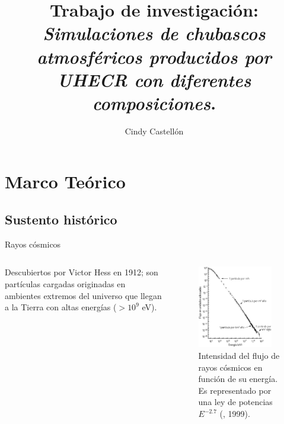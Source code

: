 \documentclass[11pt,table,compress]{beamer}
\author{Cindy Castellón}
\title[Defensa final]{\textbf{Trabajo de investigación:} \\ \textit{Simulaciones de chubascos atmosféricos producidos por UHECR con diferentes composiciones}.}
\institute{Escuela de Física}
\begin{document}
\begin{frame}
\titlepage
\end{frame}

\begin{frame}
\tableofcontents
\end{frame}

\section{Marco Teórico}
	\subsection{Sustento histórico}
	\begin{frame}{Rayos cósmicos}
		\begin{columns}
			\begin{column}{0.35\textwidth}
				\begin{block}{ }
				Descubiertos por Victor Hess en 1912; son partículas cargadas originadas en ambientes extremos del universo que llegan a la 						Tierra con altas energías ($>10^9$ eV).
				\end{block}
			\end{column}
			\begin{column}{0.65\textwidth}
				\begin{figure}
				\includegraphics[width=0.9\textwidth, height=0.6\textheight]{Figuras/espectro_RC} 
				\caption{Intensidad del flujo de rayos cósmicos en función de su energía. Es representado por una ley de potencias $E^{-2.7}$ 						(, 1999).}
				\end{figure}				
			\end{column}			
		\end{columns}	
	\end{frame}
	
\end{document}
